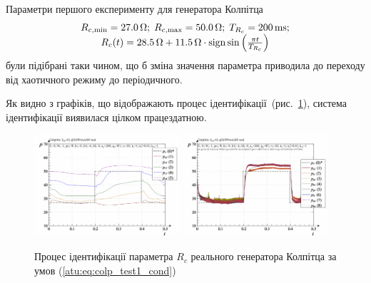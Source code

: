 
Параметри першого експерименту для генератора Колпітца
%
\begin{equation}
  \begin{array}{c}
    R_{c,\min} = \SI{27.0}{\ohm};
    \;
    R_{c,\max} = \SI{50.0}{\ohm};
    \;
    T_{R_c} = \SI{200}{\milli\second};
  \\
    R_c(t) = \SI{28.5}{\ohm} + \SI{11.5}{\ohm} \cdot \operatorname*{sign} \sin \left(  \frac{\pi t}{T_{R_c}}  \right)
  \end{array}
  \label{atu:eq:colp_test1_cond}
\end{equation}
%
були підібрані таки чином, що б зміна значення параметра
приводила до переходу від хаотичного режиму до періодичного.

Як видно з графіків, що відображають процес
ідентифікації~(рис.~\ref{atu:f:colp_r_id_1}), система ідентифікації
виявилася цілком працездатною.


\begin{figure}[htb!]
  \centerline{
    \includegraphics[width=0.48\textwidth]{p/r/colp_real_id-p_t_pi_ql3rlWvnAAW_real_d_0.png}
    \hfill
    \includegraphics[width=0.48\textwidth]{p/r/colp_real_id-p_t_p_ql3rlWvnAAW_real_d_0.png}
  }
\caption{Процес ідентифікації параметра $ R_c $ реального генератора Колпітца за умов (\ref{atu:eq:colp_test1_cond})}
  \label{atu:f:colp_r_id_1}
\end{figure}


